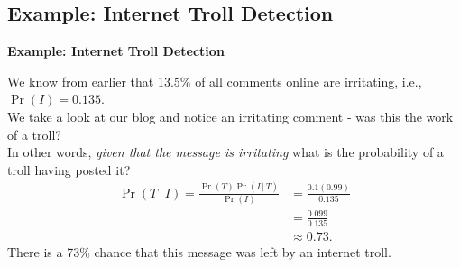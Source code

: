 \documentclass[compress]{beamer}        %
\makeatletter
\newcommand{\tcb}{\textcolor{beamer@blendedblue}}
\makeatother
\begin{document}
\subsection{Example: Internet Troll Detection}
\begin{frame}{\bf \tcb{Example: Internet Troll Detection}}

We know from earlier that 13.5\% of all comments online are irritating, i.e., $\Pr(I) = 0.135.$\\[0.4cm]

We take a look at our blog and notice an irritating comment - was this the work of a troll?\\[0.4cm]

In other words, \emph{given that the message is irritating} what is the probability of a troll having posted it?\\[-0.2cm]

\begin{align*}
\Pr(T \,|\, I) =  \frac{\Pr(T) \Pr(I \,|\, T)}{\Pr(I)} &= \frac{0.1(0.99)}{0.135}\\[0.1cm]
&= \frac{0.099}{0.135}\\[0.1cm]
&\approx 0.73.
\end{align*}
There is a 73\% chance that this message was left by an internet troll.

\end{frame}

%
%
%
%
\end{document}

